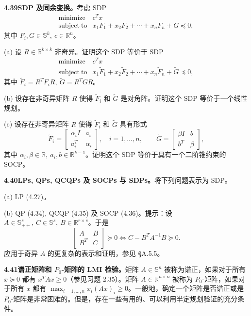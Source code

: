 \documentclass[UTF8,12pt,a4paper,fontset=fandol]{ctexart}
\begin{document}
\noindent\textbf{4.39\quad SDP 及同余变换。}\quad 考虑 SDP
\[
\begin{array}{ll}
\mathop{\mathrm{minimize}} & c^Tx\\
\mathrm{subject\ to} & x_1F_1+x_2F_2+\cdots+x_nF_n+G\preceq0,
\end{array}
\]
其中 $F_i,G\in\mathbb{S}^k,\ c\in\mathbb{R}^n$。

(a) 设 $R\in\mathbb{R}^{k\times k}$ 非奇异。证明这个 SDP 等价于 SDP
\[
\begin{array}{ll}
\mathop{\mathrm{minimize}} & c^Tx\\
\mathrm{subject\ to} & x_1\widetilde F_1+x_2\widetilde F_2+\cdots+x_n\widetilde F_n+\widetilde G\preceq0,
\end{array}
\]
其中 $\widetilde F_i=R^TF_iR,\ \widetilde G=R^TGR$。

(b) 设存在非奇异矩阵 $R$ 使得 $\widetilde F_i$ 和 $\widetilde G$ 是对角阵。证明这个 SDP 等价于一个线性规划。

(c) 设存在非奇异矩阵 $R$ 使得 $\widetilde F_i$ 和 $\widetilde G$ 具有形式
\[
\widetilde F_i=\begin{bmatrix}\alpha_iI&a_i\\a_i^T&\alpha_i\end{bmatrix},\quad i=1,\ldots,n,\qquad
\widetilde G=\begin{bmatrix}\beta I&b\\b^T&\beta\end{bmatrix},
\]
其中 $\alpha_i,\beta\in\mathbb{R},\ a_i,b\in\mathbb{R}^{k-1}$。证明这个 SDP 等价于具有一个二阶锥约束的 SOCP。

\noindent\textbf{4.40\quad LPs, QPs, QCQPs 及 SOCPs 与 SDPs。}\quad 将下列问题表示为 SDP。

(a) LP (4.27)。

(b) QP (4.34), QCQP (4.35) 及 SOCP (4.36)。提示：设 $A\in\mathbb{S}_{++}^s,\ C\in\mathbb{S}^s,\ B\in\mathbb{R}^{r\times s}$。于是
\[
\begin{bmatrix}A&B\\B^T&C\end{bmatrix}\succeq0\Longleftrightarrow C-B^TA^{-1}B\succeq0.
\]
应用于奇异 $A$ 的更复杂的表示和证明，参见 \S A.5.5。

\noindent\textbf{4.41\quad 谱正矩阵和 $P_0$-矩阵的 LMI 检验。}\quad 矩阵 $A\in\mathbb{S}^n$ 被称为谱正，如果对于所有 $x\succeq0$ 都有 $x^TAx\geq0$（参见习题 2.35）。矩阵 $A\in\mathbb{R}^{n\times n}$ 被称为 $P_0$-矩阵，如果对于所有 $x$ 都有 $\max_{i=1,\ldots,n}x_i(Ax)_i\geq0$。一般地，确定一个矩阵是否谱正或是 $P_0$-矩阵是非常困难的。但是，存在一些有用的、可以利用半定规划验证的充分条件。
\end{document}

